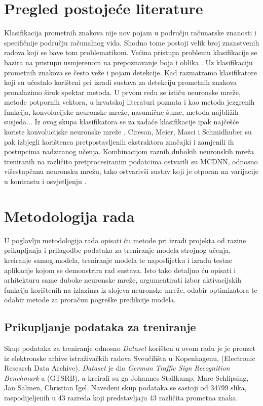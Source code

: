 \documentclass[times, utf8, zavrsni]{fer}
\begin{document}
\chapter{Pregled postojeće literature}
Klasifikacija prometnih znakova nije nov pojam u području računarske znanosti i specifičnije području računalnog vida. Shodno tome postoji velik broj znanstvenih radova koji se bave tom problematikom.
Većina pristupa problemu klasifikacije se bazira na pristupu usmjerenom na prepoznavanje boja i oblika \citep{6033494}.
Uz klasifikaciju prometnih znakova se često veže i pojam detekcije.
Kad razmatramo klasifikatore koji su učestalo korišteni pri izradi sustava za detekciju prometnih znakova pronalazimo širok spektar metoda. 
U prvom redu se ističu neuronske mreže, metode potpornih vektora, u hrvatskoj literaturi poznata i kao metoda jezgrenih funkcija, konvolucijske neuronske mreže, nasumične šume, metoda najbližih susjeda...
Iz ovog skupa klasifikatora se za zadaće klasifikacije ipak najčešće koriste konvolucijske neuronske mreže \citep{9065537}.
Ciresan, Meier, Masci i Schmidhuber su pak izbjegli korištenea pretpostavljenih ekstraktora značajki i zamjenili ih postupcima nadziranog učenja. Kombinacijom raznih dubokih
neuronskih mreža treniranih na različito pretprocesiranim podatcima ostvarili su MCDNN, odnosno višestupčanu neuronsku mrežu, tako ostvarivši sustav koji je otporan na varijacije u kontrastu i osvjetljenju \citep{CIRESAN2012333}.
\chapter{Metodologija rada}
U poglavlju metodologija rada opisati ću metode pri izradi projekta od razine prikupljanja i prilagodbe podataka za treniranje modela strojnog učenja, kreiranje samog modela, treniranje modela te naposlijetku i izradu testne aplikacije kojom se demonstrira rad sustava.
Isto tako detaljno ću opisati i arhitekturu same duboke neuronske mreže, argumentirati izbor aktivacijskih funkcija korištenih na izlazima iz slojeva neuronske mreže, odabir optimizatora te odabir metode za proračun pogreške predikcije modela.
\pagebreak
\section{Prikupljanje podataka za treniranje}
Skup podataka za treniranje odnosno
\emph{Dataset} korišten u ovom radu je je preuzet iz elektronske arhive istraživačkih radova Sveučilišta u Kopenhagenu, (Electronic Research Data Archive).
\emph{Dataset} je dio \emph{German Traffic Sign Recognition Benchmark}-a (GTSRB), a kreirali su ga Johannes Stallkamp, Marc Schlipsing, Jan Salmen, Christian Igel.
Navedeni skup podataka se sastoji od 34799 slika, raspodijeljenih u 43 razreda koji predstavljaju 43 različita prometna znaka.
\end{document}
